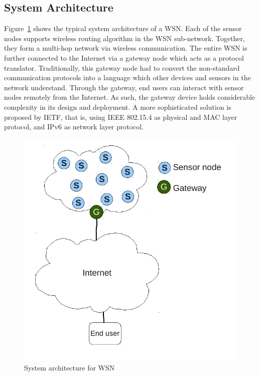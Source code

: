 \subsection{System Architecture}
\label{General:WSN:SysArc}

Figure~\ref{fig:WSNArc} shows the typical system architecture of a WSN. Each of the sensor nodes supports wireless routing algorithm in the WSN sub-network. Together, they form a multi-hop network via wireless communication. The entire WSN is further connected to the Internet via a gateway node which acts as a protocol translator. Traditionally, this gateway node had to convert the non-standard communication protocols into a language which other devices and sensors in the network understand. Through the gateway, end users can interact with sensor nodes remotely from the Internet. As such, the gateway device holds considerable complexity in its design and deployment. A more sophisticated solution is proposed by IETF, that is, using IEEE 802.15.4 as physical and MAC layer protocol, and IPv6 as network layer protocol. 
\begin{figure}[htbp]
  \begin{center}
    \leavevmode
      \includegraphics[scale=0.5]
      {Pics/WSNArc.pdf}
   \caption{System architecture for WSN}
    \label{fig:WSNArc}
  \end{center}
\end{figure}

